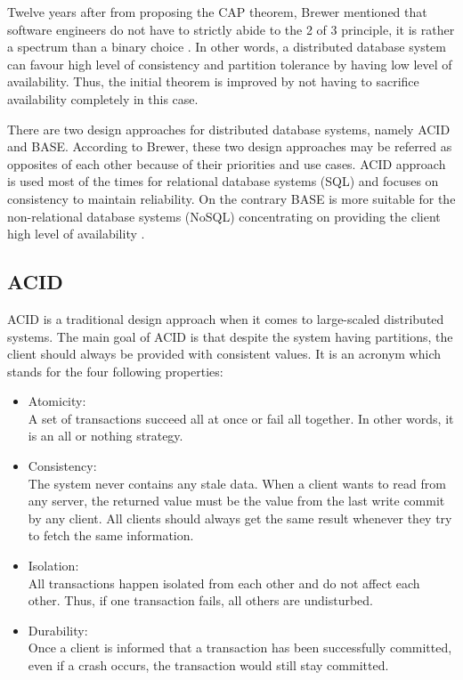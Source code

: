 Twelve years after from proposing the CAP theorem, Brewer mentioned that software engineers do not have to strictly abide to the 2 of 3 principle, it is rather a spectrum than a binary choice \cite{brewer2012cap}. In other words, a distributed database system can favour high level of consistency and partition tolerance by having low level of availability. Thus, the initial theorem is improved by not having to sacrifice availability completely in this case.

There are two design approaches for distributed database systems, namely ACID and BASE. According to Brewer, these two design approaches may be referred as opposites of each other \cite{brewer2012cap} because of their priorities and use cases. ACID approach is used most of the times for relational database systems (SQL) and focuses on consistency to maintain reliability. On the contrary BASE is more suitable for the non-relational database systems (NoSQL) concentrating on providing the client high level of availability \cite{brewer2000cap}.

\subsection{ACID}
\label{sec:background_acid}
ACID is a traditional design approach \cite{brewer2012cap} when it comes to large-scaled distributed systems. The main goal of ACID is that despite the system having partitions, the client should always be provided with consistent values. It is an acronym which stands for the four following properties:
\begin{itemize}
\item Atomicity:\\
A set of transactions succeed all at once or fail all together. In other words, it is an all or nothing strategy.
\item Consistency: \\
The system never contains any stale data. When a client wants to read from any server, the returned value must be the value from the last write commit by any client. All clients should always get the same result whenever they try to fetch the same information.
\item Isolation:\\
All transactions happen isolated from each other and do not affect each other. Thus, if one transaction fails, all others are undisturbed.
\item Durability:\\
Once a client is informed that a transaction has been successfully committed, even if a crash occurs, the transaction would still stay committed.
\end{itemize} 

